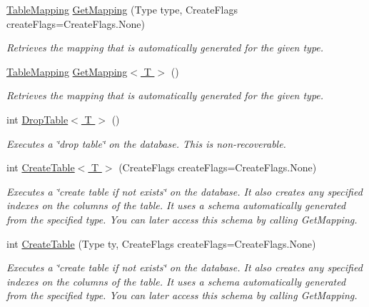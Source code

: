 \begin{DoxyCompactItemize}
\item 
\hyperlink{classSQLite_1_1TableMapping}{Table\-Mapping} \hyperlink{classSQLite_1_1SQLiteConnection_a0c0db552a653e0797cf772706148eb41}{Get\-Mapping} (Type type, Create\-Flags create\-Flags=Create\-Flags.\-None)
\begin{DoxyCompactList}\small\item\em Retrieves the mapping that is automatically generated for the given type. \end{DoxyCompactList}\item 
\hyperlink{classSQLite_1_1TableMapping}{Table\-Mapping} \hyperlink{classSQLite_1_1SQLiteConnection_adf0ed08567e1ca36e4fda72c94ede544}{Get\-Mapping$<$ T $>$} ()
\begin{DoxyCompactList}\small\item\em Retrieves the mapping that is automatically generated for the given type. \end{DoxyCompactList}\item 
int \hyperlink{classSQLite_1_1SQLiteConnection_a783032226b2db2ebd6417f21abe9cd5a}{Drop\-Table$<$ T $>$} ()
\begin{DoxyCompactList}\small\item\em Executes a \char`\"{}drop table\char`\"{} on the database. This is non-\/recoverable. \end{DoxyCompactList}\item 
int \hyperlink{classSQLite_1_1SQLiteConnection_abc8fda93774fb74dd2f97e9549eb46b5}{Create\-Table$<$ T $>$} (Create\-Flags create\-Flags=Create\-Flags.\-None)
\begin{DoxyCompactList}\small\item\em Executes a \char`\"{}create table if not exists\char`\"{} on the database. It also creates any specified indexes on the columns of the table. It uses a schema automatically generated from the specified type. You can later access this schema by calling Get\-Mapping. \end{DoxyCompactList}\item 
int \hyperlink{classSQLite_1_1SQLiteConnection_abfd7ba959c93db259983427b5e7ee05a}{Create\-Table} (Type ty, Create\-Flags create\-Flags=Create\-Flags.\-None)
\begin{DoxyCompactList}\small\item\em Executes a \char`\"{}create table if not exists\char`\"{} on the database. It also creates any specified indexes on the columns of the table. It uses a schema automatically generated from the specified type. You can later access this schema by calling Get\-Mapping. \end{DoxyCompactList}\item 

\end{DoxyCompactItemize}
